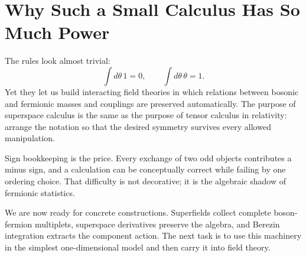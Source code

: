 \section{Why Such a Small Calculus Has So Much Power}

The rules look almost trivial:
\begin{equation}
\int d\theta\,1=0,
\qquad
\int d\theta\,\theta=1.
\end{equation}
Yet they let us build interacting field theories in which relations between bosonic and fermionic masses and couplings are preserved automatically. The purpose of superspace calculus is the same as the purpose of tensor calculus in relativity: arrange the notation so that the desired symmetry survives every allowed manipulation.

Sign bookkeeping is the price. Every exchange of two odd objects contributes a minus sign, and a calculation can be conceptually correct while failing by one ordering choice. That difficulty is not decorative; it is the algebraic shadow of fermionic statistics.

\begin{classroomqa}
\end{classroomqa}

We are now ready for concrete constructions. Superfields collect complete boson-fermion multiplets, superspace derivatives preserve the algebra, and Berezin integration extracts the component action. The next task is to use this machinery in the simplest one-dimensional model and then carry it into field theory.
